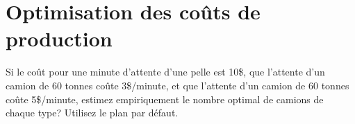 	\section{Optimisation des coûts de production}
	
	Si le coût pour une minute d’attente d’une pelle est 10\$, que l’attente d’un camion de 60 tonnes coûte 3\$/minute, et que l’attente d’un camion de 60 tonnes coûte 5\$/minute, estimez empiriquement le nombre optimal de camions de chaque type? Utilisez le plan par défaut.
	